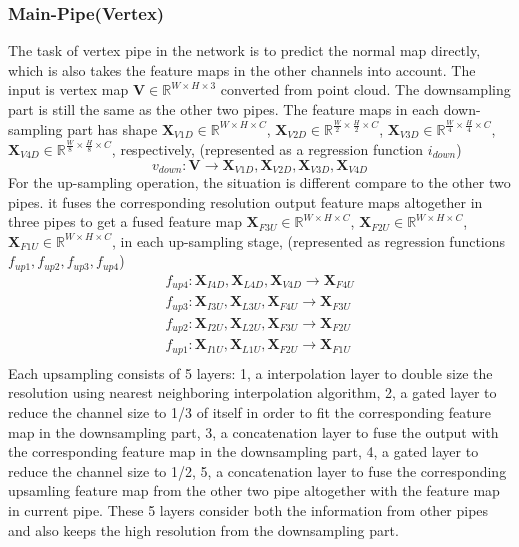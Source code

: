 \subsubsection{Main-Pipe(Vertex)}
The task of vertex pipe in the network is to predict the normal map directly, which is also takes the feature maps in the other channels into account. The input is vertex map $ \textbf{V} \in \mathbb{R}^{W\times H\times 3}$ converted from point cloud. 
The downsampling part is still the same as the other two pipes. The feature maps in each down-sampling part has shape $ \textbf{X}_{V1D} \in \mathbb{R}^{{W}\times H\times C} $, 
$ \textbf{X}_{V2D} \in \mathbb{R}^{\frac{W}{2}\times \frac{H}{2}\times C} $,
$ \textbf{X}_{V3D} \in \mathbb{R}^{\frac{W}{4}\times \frac{H}{4}\times C} $,
$ \textbf{X}_{V4D} \in \mathbb{R}^{\frac{W}{8}\times \frac{H}{8}\times C} $, respectively, 
(represented as a regression function $ i_{down} $)
\[ v_{down}: \textbf{V} \rightarrow  \textbf{X}_{V1D} , \textbf{X}_{V2D}, \textbf{X}_{V3D}, \textbf{X}_{V4D} \]
For the up-sampling operation, the situation is different compare to  the other two pipes.
it fuses the corresponding resolution output feature maps altogether in three pipes to get a fused feature map 
$ \textbf{X}_{F3U} \in \mathbb{R}^{W\times H\times C} $, 
$\textbf{X}_{F2U} \in \mathbb{R}^{W\times H\times C} $, 
$\textbf{X}_{F1U} \in \mathbb{R}^{W\times H\times C} $,
in each up-sampling stage, (represented as regression functions $ f_{up1}, f_{up2}, f_{up3}, f_{up4}$)
\[ 
\begin{matrix}
	f_{up4} : \textbf{X}_{I4D}, \textbf{X}_{L4D}, \textbf{X}_{V4D} \rightarrow \textbf{X}_{F4U} \\
	f_{up3} : \textbf{X}_{I3U}, \textbf{X}_{L3U}, \textbf{X}_{F4U} \rightarrow \textbf{X}_{F3U} \\
	f_{up2} : \textbf{X}_{I2U}, \textbf{X}_{L2U}, \textbf{X}_{F3U} \rightarrow \textbf{X}_{F2U} \\
	f_{up1} : \textbf{X}_{I1U}, \textbf{X}_{L1U}, \textbf{X}_{F2U} \rightarrow \textbf{X}_{F1U} \\
			
\end{matrix}
\]
Each upsampling consists of 5 layers: 1, a interpolation layer to double size the resolution using nearest neighboring interpolation algorithm, 2, a gated layer to reduce the channel size to 1/3 of itself in order to fit the corresponding feature map in the downsampling part, 3, a concatenation layer to fuse the output with the corresponding feature map in the downsampling part, 4, a gated layer to reduce the channel size to 1/2, 5, a concatenation layer to fuse the corresponding upsamling feature map from the other two pipe altogether with the feature map in current pipe. These 5 layers consider both the information from other pipes and also keeps the high resolution from the downsampling part. 

